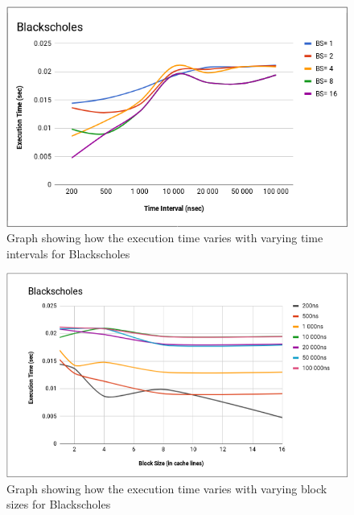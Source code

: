 \documentclass{listhesis}
\begin{document}
\begin{figure}
  \includegraphics[width=\linewidth]{Blacksc_var_bs_t.png}
  \centering
  \caption{Graph showing how the execution time varies with varying time intervals for Blackscholes}
  \label{fig:Blacksc_var_bs_t.png}
\end{figure}

\begin{figure}
  \includegraphics[width=\linewidth]{Blacksc_var_bs_fordiff_t.png}
  \centering
  \caption{Graph showing how the execution time varies with varying block sizes for Blackscholes}
  \label{fig:Blacksc_var_bs_fordiff_t.png}
\end{figure}
\end{document}
